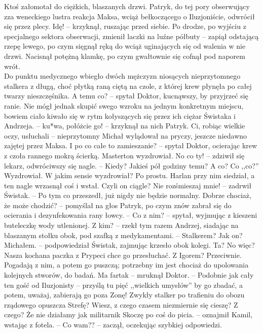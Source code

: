 \documentclass[../MAIN.tex]{subfiles}
\begin{document}
Ktoś załomotał do ciężkich, blaszanych drzwi. Patryk, do tej pory obserwujący zza weneckiego lustra reakcja Maksa, wciąż bełkoczącego o Iluzjoniście, odwrócił się przez plecy.
\sx Idę! -- krzyknął, ruszając przed siebie.
\qd
Po drodze, po wyjściu z specjalnego sektora obserwacji, zmienił laczki na luźne półbuty -- zapiął odstającą rzepę lewego, po czym sięgnął ręką do wciąż uginających się od walenia w nie drzwi. Nacisnął potężną klamkę, po czym gwałtownie się cofnął pod naporem wrót.\\
Do punktu medycznego wbiegło dwóch mężczyzn niosących nieprzytomnego stalkera z długą, choć płytką raną ciętą na czole, z której krew płynęła po całej twarzy nieszczęśnika.
\sx A temu co? -- spytał Doktor, kucnąwszy, by przyjrzeć się ranie. Nie mógł jednak skupić swego wzroku na jednym konkretnym miejscu, bowiem ciało kiwało się w rytm kołyszących się przez ich ciężar Świstaka i Andrzeja. -- ku*wa, połóżcie go! -- krzyknął na nich Patryk. Ci, robiąc wielkie oczy, usłuchali -- nieprzytomny Michał wylądował na pryczy, jeszcze niedawno zajętej przez Maksa.
\xx I po co całe to zamieszanie? -- spytał Doktor, ocierając krew z czoła rannego mokrą ścierką.
\xx Masterton wyzdrowiał.
\xx No co ty! -- zdziwił się lekarz, odwróciwszy się nagle. -- Kiedy?
\xx Jakieś pół godziny temu?
\xx A co?
\xx Co ,,co?''
\xx Wyzdrowiał. W jakim sensie wyzdrowiał?
\xx Po prostu. Harlan przy nim siedział, a ten nagle wrzasnął coś i wstał.
\xx Czyli on ciągle?
\xx Nie rozśmieszaj mnie! -- zadrwił Świstak. -- Po tym co przeszedł, już nigdy nie będzie normalny.
\xx Dobrze chociaż, że może chodzić? -- pomyślał na głos Patryk, po czym znów zabrał się do ocierania i dezynfekowania rany łowcy. -- Co z nim? -- spytał, wyjmując z kieszeni buteleczkę wody utlenionej.
\xx Z kim? -- rzekł tym razem Andrzej, siadając na blaszanym stołku obok, pod szafką z medykamentami. -- Stalkerem? Jak on?
\xx Michałem. -- podpowiedział Świstak, zajmując krzesło obok kolegi.
\xx Ta? No więc? Nasza kochana paczka z Prypeci chce go przesłuchać.
\xx Z Igorem?
\xx Przeciwnie. Pogadają z nim, a potem go puszczą; potrzebny im jest chociaż do upolowania kolejnych stworów, do badań.
\xx Ma farta\3k -- mruknął Doktor. -- Podobnie jak cały ten gość od Iluzjonisty -- przyślą tu pięć ,,wielkich umysłów'' by go zbadać, a potem, uważaj, zabierają go poza Zonę! Zwykły stalker po trafieniu do obozu rządowego opuszcza Strefę? Wiesz, z czego czasem niezmiernie się cieszę?
\xx Z czego?
\xx Że nie działamy jak militarni\3k
\qd
% 
% 
% 
% 
\sx Skoczę po coś do picia. -- oznajmił Kamil, wstając z fotela. -- Co wam?? -- zaczął, oczekując szybkiej odpowiedzi.
\end{document}
